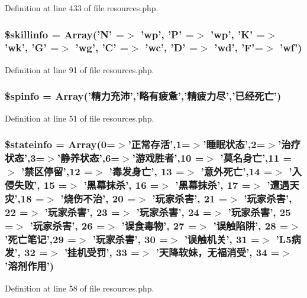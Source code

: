 Definition at line 433 of file resources.\+php.

\hypertarget{resources_8php_a94b9a3413b45767e103c4f7ad2346921}{
\subsubsection[{\$skillinfo}]{\setlength{\rightskip}{0pt plus 5cm}\$skillinfo = Array('N' =$>$ 'wp', 'P' =$>$ 'wp', 'K' =$>$ 'wk', 'G' =$>$ 'wg', 'C' =$>$ 'wc', 'D' =$>$ 'wd', 'F'=$>$ 'wf')}}\label{resources_8php_a94b9a3413b45767e103c4f7ad2346921}


Definition at line 91 of file resources.\+php.

\hypertarget{resources_8php_a79b3890cc1a3fac35858fb155b285743}{
\subsubsection[{\$spinfo}]{\setlength{\rightskip}{0pt plus 5cm}\$spinfo = Array('精力充沛','略有疲惫','精疲力尽','已经死亡')}}\label{resources_8php_a79b3890cc1a3fac35858fb155b285743}


Definition at line 51 of file resources.\+php.

\hypertarget{resources_8php_a014f40ed69f3ce2bd7a3263f5b5c9d91}{
\subsubsection[{\$stateinfo}]{\setlength{\rightskip}{0pt plus 5cm}\$stateinfo = Array(0=$>$'正常存活',1=$>$'睡眠状态',2=$>$'治疗状态',3=$>$'静养状态',6=$>$'游戏胜者',10 =$>$ '莫名身亡',11 =$>$ '禁区停留',12 =$>$ '毒发身亡', 13 =$>$ '意外死亡',14 =$>$ '入侵失败', 15 =$>$ '黑幕抹杀', 16 =$>$ '黑幕抹杀', 17 =$>$ '遭遇天灾',18 =$>$ '烧伤不治', 20 =$>$ '玩家杀害', 21 =$>$ '玩家杀害', 22 =$>$ '玩家杀害', 23 =$>$ '玩家杀害', 24 =$>$ '玩家杀害', 25 =$>$ '玩家杀害', 26 =$>$ '误食毒物', 27 =$>$ '误触陷阱', 28 =$>$ '死亡笔记',29 =$>$ '玩家杀害', 30 =$>$ '误触机关', 31 =$>$ 'L5病发', 32 =$>$ '挂机受罚', 33 =$>$ '天降软妹，无福消受', 34 =$>$ '溶剂作用')}}\label{resources_8php_a014f40ed69f3ce2bd7a3263f5b5c9d91}


Definition at line 58 of file resources.\+php.

